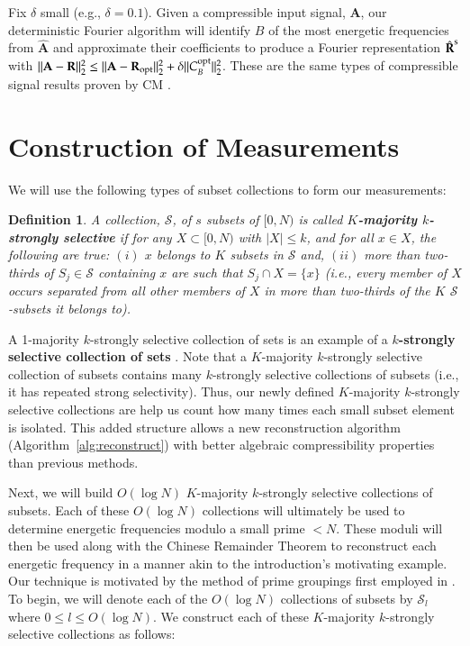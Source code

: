 \documentclass{article}
\begin{document}
Fix $\delta$ small (e.g., $\delta = 0.1$).
Given a compressible input signal, $\textbf{A}$, our deterministic Fourier algorithm will identify $B$ of the most energetic frequencies from $\hat{\textbf{A}}$ and approximate their coefficients to produce a Fourier representation $\hat{\textbf{R}}^{\rm s}$ with $\| \textbf{A} - \textbf{R} \|^{2}_{2} \leq \| \textbf{A} - \textbf{R}_{\rm opt} \|^{2}_{2} + \delta \| C^{\rm opt}_{B} \|^{2}_{2}$.  These are the same types of compressible signal results proven by CM \cite{CMDetCS1,CMDetCS2}.

\section{Construction of Measurements}
\label{sec:Measurements}

We will use the following types of subset collections to form our measurements:

\newtheorem{Definition}{Definition}
\begin{Definition}
A collection, $\mathcal{S}$, of $s$ subsets of $[0,N)$ is called \textbf{$K$-majority $k$-strongly selective} if for any $X \subset [0,N)$ with $| X | \leq k$, and for all $x \in X$, the following are true:  $(i)$ $x$ belongs to $K$ subsets in $\mathcal{S}$ and, $(ii)$ more than two-thirds of $S_{j} \in \mathcal{S}$ containing $x$ are such that $S_{j} \cap X = \{ x \}$ (i.e., every member of $X$ occurs separated from all other members of $X$ in more than two-thirds of the $K$ $\mathcal{S}$-subsets it belongs to).
\label{def:SepSets}
\end{Definition}

A 1-majority $k$-strongly selective collection of sets is an example of a \textbf{$k$-strongly selective collection of sets} \cite{Constructions,CMDetCS3}.  Note that a $K$-majority $k$-strongly selective collection of subsets contains many $k$-strongly selective collections of subsets (i.e., it has repeated strong selectivity).  Thus, our newly defined $K$-majority $k$-strongly selective collections are help us count how many times each small subset element is isolated.  This added structure allows a new reconstruction algorithm (Algorithm~\ref{alg:reconstruct}) with better algebraic compressibility properties than previous methods.

Next, we will build $O(\log N)$ $K$-majority $k$-strongly selective collections of subsets.  Each of these $O(\log N)$ collections will ultimately be used to determine energetic frequencies modulo a small prime $< N$.  These moduli will then be used along with the Chinese Remainder Theorem to reconstruct each energetic frequency in a manner akin to the introduction's motivating example.  Our technique is motivated by the method of prime groupings first employed in \cite{FirstDetCS}.  To begin, we will denote each of the $O(\log N)$ collections of subsets by $\mathcal{S}_{l}$ where $0 \leq l \leq O(\log N)$.  We construct each of these $K$-majority $k$-strongly selective collections as follows:  
\end{document}
